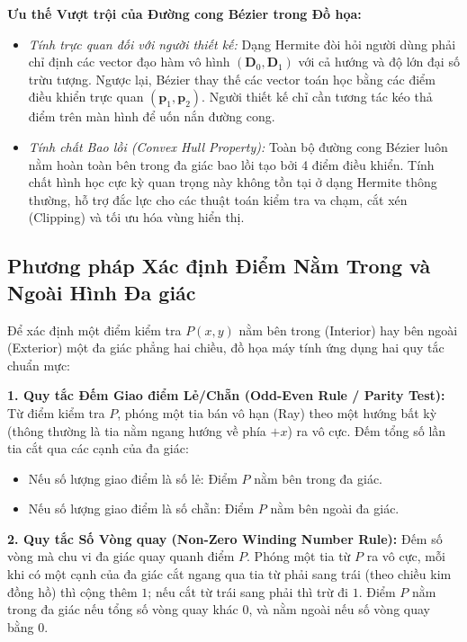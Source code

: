 \textbf{Ưu thế Vượt trội của Đường cong Bézier trong Đồ họa:}
\begin{itemize}
    \item \textit{Tính trực quan đối với người thiết kế:} Dạng Hermite đòi hỏi người dùng phải chỉ định các vector đạo hàm vô hình $(\mathbf{D}_0, \mathbf{D}_1)$ với cả hướng và độ lớn đại số trừu tượng. Ngược lại, Bézier thay thế các vector toán học bằng các điểm điều khiển trực quan $(\mathbf{p}_1, \mathbf{p}_2)$. Người thiết kế chỉ cần tương tác kéo thả điểm trên màn hình để uốn nắn đường cong.
    \item \textit{Tính chất Bao lồi (Convex Hull Property):} Toàn bộ đường cong Bézier luôn nằm hoàn toàn bên trong đa giác bao lồi tạo bởi 4 điểm điều khiển. Tính chất hình học cực kỳ quan trọng này không tồn tại ở dạng Hermite thông thường, hỗ trợ đắc lực cho các thuật toán kiểm tra va chạm, cắt xén (Clipping) và tối ưu hóa vùng hiển thị.
\end{itemize}

\subsection{Phương pháp Xác định Điểm Nằm Trong và Ngoài Hình Đa giác}
\label{subsec:w5_inside}

Để xác định một điểm kiểm tra $P(x, y)$ nằm bên trong (Interior) hay bên ngoài (Exterior) một đa giác phẳng hai chiều, đồ họa máy tính ứng dụng hai quy tắc chuẩn mực:

\textbf{1. Quy tắc Đếm Giao điểm Lẻ/Chẵn (Odd-Even Rule / Parity Test):}
Từ điểm kiểm tra $P$, phóng một tia bán vô hạn (Ray) theo một hướng bất kỳ (thông thường là tia nằm ngang hướng về phía $+x$) ra vô cực. Đếm tổng số lần tia cắt qua các cạnh của đa giác:
\begin{itemize}
    \item Nếu số lượng giao điểm là số lẻ: Điểm $P$ nằm bên trong đa giác.
    \item Nếu số lượng giao điểm là số chẵn: Điểm $P$ nằm bên ngoài đa giác.
\end{itemize}

\textbf{2. Quy tắc Số Vòng quay (Non-Zero Winding Number Rule):}
Đếm số vòng mà chu vi đa giác quay quanh điểm $P$. Phóng một tia từ $P$ ra vô cực, mỗi khi có một cạnh của đa giác cắt ngang qua tia từ phải sang trái (theo chiều kim đồng hồ) thì cộng thêm $1$; nếu cắt từ trái sang phải thì trừ đi $1$. Điểm $P$ nằm trong đa giác nếu tổng số vòng quay khác 0, và nằm ngoài nếu số vòng quay bằng 0.

